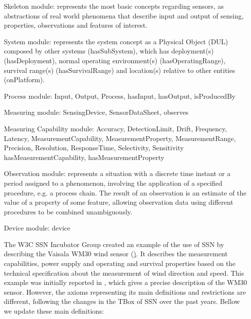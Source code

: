 \documentclass{sig-alternate-05-2015}
\begin{document}
Skeleton module: represents the most basic concepts regarding sensors, as abstractions of real world phenomena that describe input and output of sensing, properties, observations and features of interest.

System module: represents the system concept as a Physical Object (DUL) composed by other systems (hasSubSystem), which has deployment(s) (hasDeployment), normal operating environment(s) (hasOperatingRange), survival range(s) (hasSurvivalRange) and location(s) relative to other entities (onPlatform).

Process module: Input, Output, Process, hasInput, hasOutput, isProducedBy

Measuring module: SensingDevice, SensorDataSheet, observes

Measuring Capability module: Accuracy, DetectionLimit, Drift, Frequency, Latency, MeasurementCapability, MeasurementProperty, MeasurementRange, Precision, Resolution, ResponseTime, Selectivity, Sensitivity	hasMeasurementCapability, hasMeasurementProperty

Observation module: represents a situation with a discrete time instant or a period assigned to a phenomenon, involving the application of a specified procedure, e.g. a process chain. The result of an observation is an estimate of the value of a property of some feature, allowing observation data using different procedures to be combined unambiguously. 

Device module: device

The W3C SSN Incubator Group created an example of the use of SSN by describing the Vaisala WM30 wind sensor (\href{https://www.w3.org/2005/Incubator/ssn/ssnx/meteo/WM30.html}). It describes the measurement capabilities, power supply and operating and survival properties based on the technical specification about the measurement of wind direction and speed. This example was initially reported in \cite{Compton2009}, which gives a precise description of the WM30 sensor. However, the axioms representing its main definitions and restrictions are different, following the changes in the TBox of SSN over the past years. Bellow we update these main definitions:
\end{document}
